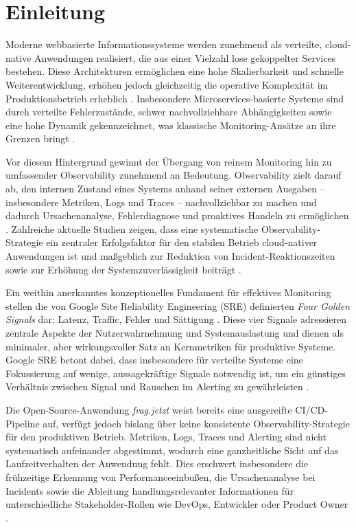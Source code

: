 

\section{Einleitung}

Moderne webbasierte Informationssysteme werden zunehmend als verteilte, cloud-native Anwendungen realisiert, die aus einer Vielzahl lose gekoppelter Services bestehen. Diese Architekturen ermöglichen eine hohe Skalierbarkeit und schnelle Weiterentwicklung, erhöhen jedoch gleichzeitig die operative Komplexität im Produktionsbetrieb erheblich \cite{faseeha2025observability,sakinala2025observability}. Insbesondere Microservices-basierte Systeme sind durch verteilte Fehlerzustände, schwer nachvollziehbare Abhängigkeiten sowie eine hohe Dynamik gekennzeichnet, was klassische Monitoring-Ansätze an ihre Grenzen bringt \cite{fischer2024microservice}.

Vor diesem Hintergrund gewinnt der Übergang von reinem Monitoring hin zu umfassender Observability zunehmend an Bedeutung. Observability zielt darauf ab, den internen Zustand eines Systems anhand seiner externen Ausgaben – insbesondere Metriken, Logs und Traces – nachvollziehbar zu machen und dadurch Ursachenanalyse, Fehlerdiagnose und proaktives Handeln zu ermöglichen \cite{sridharan2018distributed,faseeha2025observability}. Zahlreiche aktuelle Studien zeigen, dass eine systematische Observability-Strategie ein zentraler Erfolgsfaktor für den stabilen Betrieb cloud-nativer Anwendungen ist und maßgeblich zur Reduktion von Incident-Reaktionszeiten sowie zur Erhöhung der Systemzuverlässigkeit beiträgt \cite{giamattei2024monitoring,sakinala2025observability}.

Ein weithin anerkanntes konzeptionelles Fundament für effektives Monitoring stellen die von Google Site Reliability Engineering (SRE) definierten \emph{Four Golden Signals} dar: Latenz, Traffic, Fehler und Sättigung \cite{ewaschukMonitoringDistributedSystems}. Diese vier Signale adressieren zentrale Aspekte der Nutzerwahrnehmung und Systemauslastung und dienen als minimaler, aber wirkungsvoller Satz an Kernmetriken für produktive Systeme. Google SRE betont dabei, dass insbesondere für verteilte Systeme eine Fokussierung auf wenige, aussagekräftige Signale notwendig ist, um ein günstiges Verhältnis zwischen Signal und Rauschen im Alerting zu gewährleisten \cite{ewaschukMonitoringDistributedSystems}.

Die Open-Source-Anwendung \emph{frag.jetzt} weist bereits eine ausgereifte CI/CD-Pipeline auf, verfügt jedoch bislang über keine konsistente Observability-Strategie für den produktiven Betrieb. Metriken, Logs, Traces und Alerting sind nicht systematisch aufeinander abgestimmt, wodurch eine ganzheitliche Sicht auf das Laufzeitverhalten der Anwendung fehlt. Dies erschwert insbesondere die frühzeitige Erkennung von Performanceeinbußen, die Ursachenanalyse bei Incidents sowie die Ableitung handlungsrelevanter Informationen für unterschiedliche Stakeholder-Rollen wie DevOps, Entwickler oder Product Owner \cite{faseeha2025observability,giamattei2024monitoring}.


